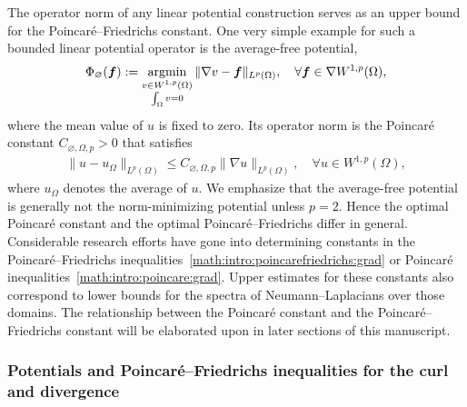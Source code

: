 \documentclass[10pt,a4paper]{article}
\begin{document}
The operator norm of any linear potential construction serves as an upper bound for the Poincar\'e--Friedrichs constant. 
One very simple example for such a bounded linear potential operator is the average-free potential, 
\begin{align}\label{math:intro:poincarepotential}
    \Phi_{\varnothing}( \bm{f} ) 
    := 
    \operatorname*{{\rm argmin}}\limits_{ \substack{ v \in W^{1,p}(\Omega) \\ \int_\Omega v = 0 } } \| \nabla v - \bm{f} \|_{L^{p}(\Omega)},
    \quad 
    \forall 
    \bm{f} \in \nabla W^{1,p}(\Omega)
    ,
\end{align} 
where the mean value of $u$ is fixed to zero. 
Its operator norm is the Poincar\'e constant $C_{\varnothing,\Omega,p} > 0$ that satisfies %
\begin{align}\label{math:intro:poincare:grad}
    \| u - u_{\Omega} \|_{L^{p}(\Omega)}
    \leq 
    C_{\varnothing,\Omega,p} \| \nabla u \|_{L^{p}(\Omega)},
    \quad 
    \forall 
    u \in W^{1,p}(\Omega)
    , \tag{P} 
\end{align}
where $u_\Omega$ denotes the average of $u$. We emphasize that the average-free potential is generally not the norm-minimizing potential unless $p = 2$.
Hence the optimal Poincar\'e constant and the optimal Poincar\'e--Friedrichs differ in general. 
Considerable research efforts have gone into determining constants in the Poincar\'e--Friedrichs inequalities~\eqref{math:intro:poincarefriedrichs:grad} or Poincar\'e inequalities~\eqref{math:intro:poincare:grad}. Upper estimates for these constants also correspond to lower bounds for the spectra of Neumann--Laplacians over those domains. 
The relationship between the Poincar\'e constant and the Poincar\'e--Friedrichs constant will be elaborated upon in later sections of this manuscript. 



\subsubsection{Potentials and Poincar\'e--Friedrichs inequalities for the curl and divergence}
\end{document}
